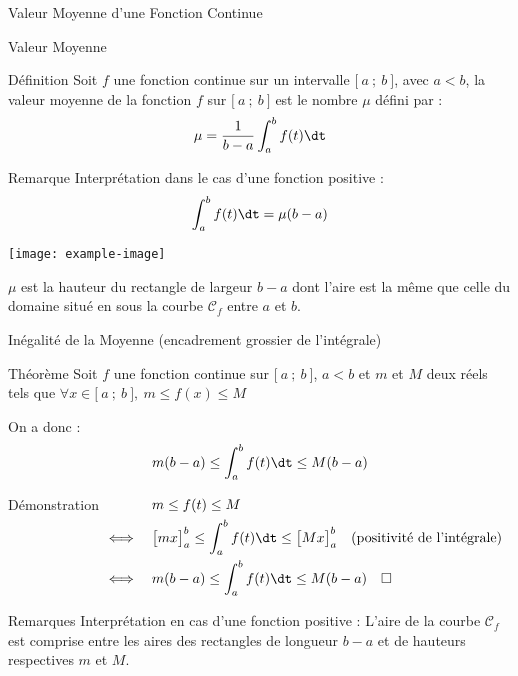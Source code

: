 \documentclass{cours}
\begin{document}
    \pagebreak
    \begin{Gpartie}{Valeur Moyenne d'une Fonction Continue} 
        \begin{Spartie}{Valeur Moyenne} 
            \begin{SSpartie}{Définition} 
                Soit $f$ une fonction continue sur un intervalle $\big[~a~;~b~\big]$, avec $a<b$, la valeur moyenne de la fonction $f$ sur $\big[~a~;~b~\big]$ est le nombre $\mu$ défini par : \[\mu=\frac{1}{b-a}\int_a^b f(t)\dt\]
            \end{SSpartie}
            \begin{SSpartie}{Remarque} 
                Interprétation dans le cas d'une fonction positive : \[\int_a^b f(t)\dt=\mu(b-a)\]

                \begin{center}
                        \texttt{[image: example-image]}
                    \parbox{\linewidth}{}
                \end{center}

                $\mu$ est la hauteur du rectangle de largeur $b-a$ dont l'aire est la même que celle du domaine situé en sous la courbe $\mathcal{C}_f$ entre $a$ et $b$.
            \end{SSpartie}
        \end{Spartie}
        \pagebreak
        \begin{Spartie}{Inégalité de la Moyenne (encadrement \og grossier \fg{} de l'intégrale)} 
            \begin{SSpartie}{Théorème} 
                Soit $f$ une fonction continue sur $\big[~a~;~b~\big]$, $a<b$ et $m$ et $M$ deux réels tels que $\forall x\in\big[~a~;~b~\big],~m\leq f(x)\leq M$

                On a donc : \[m(b-a)\leq\int_a^b f(t)\dt\leq M(b-a)\]
                \begin{SSSpartie}{Démonstration} 
                    $\begin{aligned}[t]
                        &\quad m\leq f(t)\leq M \\
                        \iff&\quad\big[mx\big]_a^b\leq\int_a^b f(t)\dt\leq \big[Mx\big]_a^b\quad\text{(positivité de l'intégrale)} \\
                        \iff&\quad m(b-a)\leq\int_a^b f(t)\dt \leq M(b-a)\quad\square
                    \end{aligned}$
                \end{SSSpartie}
            \end{SSpartie}
            \begin{SSpartie}{Remarques} 
                Interprétation en cas d'une fonction positive : L'aire de la courbe $\mathcal{C}_f$ est comprise entre les aires des rectangles de longueur $b-a$ et de hauteurs respectives $m$ et $M$.
                

\end{SSpartie}
\end{Spartie}
\end{Gpartie}
\end{document}

